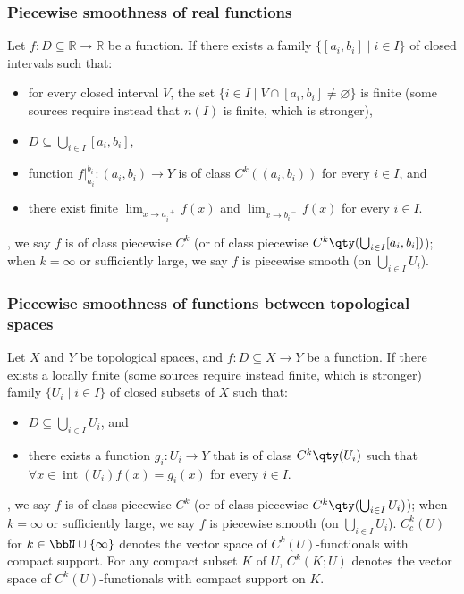 \subsubsection{Piecewise smoothness of real functions}
Let $f\colon D\subseteq\mathbb{R}\to\mathbb{R}$ be a function. If there exists a family $\{[a_i,b_i]\mid i\in I\}$ of closed intervals such that:
\begin{itemize}
\item for every closed interval $V$, the set $\{i\in I\mid V\cap [a_i,b_i]\neq\varnothing\}$ is finite (some sources require instead that $n(I)$ is finite, which is stronger),
\item $D\subseteq\bigcup_{i\in I}[a_i,b_i]$,
\item function $f\big\vert_{a_i}^{b_i}\colon(a_i,b_i)\to Y$ is of class $C^k((a_i,b_i))$ for every $i\in I$, and
\item there exist finite $\lim_{x\to a_i^{\phantom{i}+}}f(x)$ and $\lim_{x\to b_i^{\phantom{i}-}}f(x)$ for every $i\in I$.
\end{itemize},
we say $f$ is of class piecewise $C^k$ (or of class piecewise $C^k\qty(\bigcup_{i\in I}[a_i,b_i])$); when $k=\infty$ or sufficiently large, we say $f$ is piecewise smooth (on $\bigcup_{i\in I}U_i$).
\subsubsection{Piecewise smoothness of functions between topological spaces}
Let $X$ and $Y$ be topological spaces, and $f\colon D\subseteq X\to Y$ be a function. If there exists a locally finite (some sources require instead finite, which is stronger) family $\{U_i\mid i\in I\}$ of closed subsets of $X$ such that:
\begin{itemize}
\item $D\subseteq\bigcup_{i\in I}U_i$, and
\item there exists a function $g_i\colon U_i\to Y$ that is of class $C^k\qty(U_i)$ such that $\forall x\in\operatorname{int}\left(U_i\right)f(x)=g_i(x)$ for every $i\in I$.
\end{itemize},
we say $f$ is of class piecewise $C^k$ (or of class piecewise $C^k\qty(\bigcup_{i\in I}U_i)$); when $k=\infty$ or sufficiently large, we say $f$ is piecewise smooth (on $\bigcup_{i\in I}U_i$).
$C^k_c(U)$ for $k\in\bbN\cup\{\infty\}$ denotes the vector space of $C^k(U)$-functionals with compact support. For any compact subset $K$ of $U$, $C^k(K;U)$ denotes the vector space of $C^k(U)$-functionals with compact support on $K$.

